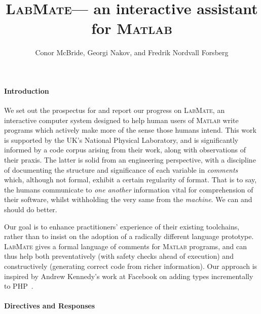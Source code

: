 \documentclass{ws-procs9x6}
\newcommand{\lr}{\textsc{LabMate}}
\newcommand{\ma}{\textsc{Matlab}}
\newcommand{\remph}{\emph}
\begin{document}
\title{\lr --- an interactive assistant for \ma}
\author{Conor McBride, Georgi Nakov, and Fredrik Nordvall Forsberg}
\address{University of Strathclyde}

\bodymatter
\paragraph{Introduction}

We set out the prospectus for and report our progress on \lr, an interactive computer system designed to help human users of \ma{} write programs which actively make more of the sense those humans intend. This work is supported by the UK's National Physical Laboratory, and is significantly informed by a code corpus arising from their work, along with observations of their praxis. The latter is solid from an engineering perspective, with a discipline of documenting the structure and significance of each variable in \remph{comments} which, although not formal, exhibit a certain regularity of format. That is to say, the humans communicate to \remph{one another} information vital for comprehension of their software, whilst withholding the very same from the \remph{machine}. We can and should do better.


Our goal is to enhance practitioners' experience of their existing toolchains, rather than to insist on the adoption of a radically different language prototype. \lr{} gives a formal language of comments for \ma{} programs, and can thus help both preventatively (with safety checks ahead of execution) and constructively (generating correct code from richer information). Our approach is inspired by Andrew Kennedy's work at Facebook on adding types incrementally to PHP~\cite{hack}.

\paragraph{Directives and Responses}
\end{document}
